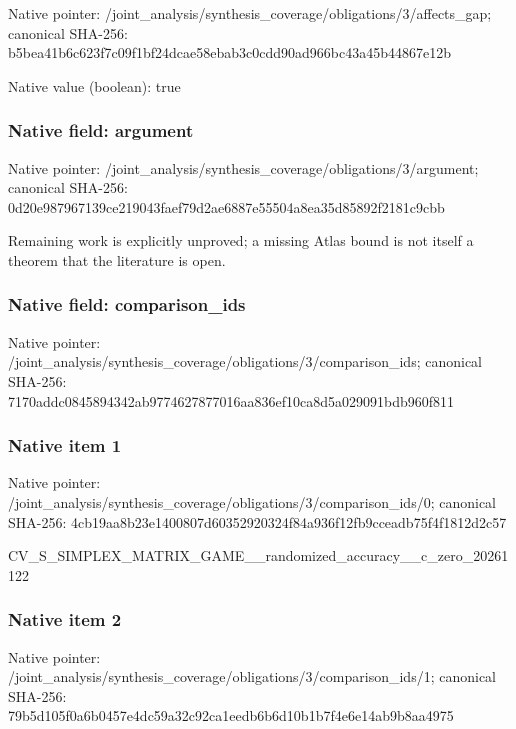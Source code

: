 \documentclass[10pt,a4paper]{article}
\begin{document}
Native pointer: /joint\_analysis/synthesi\allowbreak{}s\_coverage/obligations/3\allowbreak{}/affects\_gap; canonical SHA-256: b5bea41b6c623f7c09f1bf24\allowbreak{}dcae58ebab3c0cdd90ad966b\allowbreak{}c43a45b44867e12b



Native value (boolean): true



\subsubsection{Native field: argument}


Native pointer: /joint\_analysis/synthesi\allowbreak{}s\_coverage/obligations/3\allowbreak{}/argument; canonical SHA-256: 0d20e987967139ce219043fa\allowbreak{}ef79d2ae6887e55504a8ea35\allowbreak{}d85892f2181c9cbb


Remaining work is explicitly unproved; a missing Atlas bound is not itself a theorem that the literature is open.


\subsubsection{Native field: comparison\_ids}


Native pointer: /joint\_analysis/synthesi\allowbreak{}s\_coverage/obligations/3\allowbreak{}/comparison\_ids; canonical SHA-256: 7170addc0845894342ab9774\allowbreak{}627877016aa836ef10ca8d5a\allowbreak{}029091bdb960f811



\subsubsection{Native item 1}


Native pointer: /joint\_analysis/synthesi\allowbreak{}s\_coverage/obligations/3\allowbreak{}/comparison\_ids/0; canonical SHA-256: 4cb19aa8b23e1400807d6035\allowbreak{}2920324f84a936f12fb9ccea\allowbreak{}db75f4f1812d2c57


CV\_S\_SIMPLEX\_MATRIX\_GAME\allowbreak{}\_\_randomized\_accuracy\_\_c\allowbreak{}\_zero\_20261122


\subsubsection{Native item 2}


Native pointer: /joint\_analysis/synthesi\allowbreak{}s\_coverage/obligations/3\allowbreak{}/comparison\_ids/1; canonical SHA-256: 79b5d105f0a6b0457e4dc59a\allowbreak{}32c92ca1eedb6b6d10b1b7f4\allowbreak{}e6e14ab9b8aa4975
\end{document}
